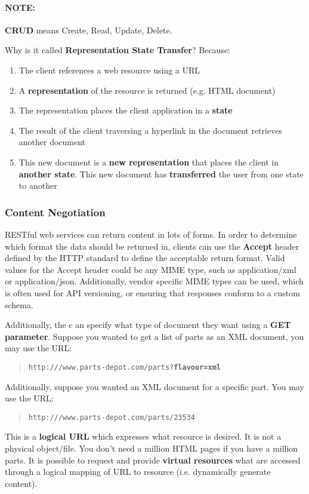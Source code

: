 \documentclass{article}
\begin{document}
\paragraph{\textbf{NOTE: }} \textbf{CRUD} means Create, Read, Update, Delete.

Why is it called \textbf{Representation State Transfer}? Because:
\begin{enumerate}
	\item The client references a web resource using a URL
	\item A \textbf{representation} of the resource is returned (e.g. HTML document)
	\item The representation places the client application in a \textbf{state}
	\item The result of the client traversing a hyperlink in the document retrieves another document
	\item This new document is a \textbf{new representation} that places the client in \textbf{another state}. This new document has \textbf{transferred} the user from one state to another
\end{enumerate}

\subsubsection{Content Negotiation}

RESTful web services can return content in lots of forms. In order to determine which format the data should be returned in, clients can use the \textbf{Accept} header defined by the HTTP standard to define the acceptable return format. Valid values for the Accept header could be any MIME type, such as application/xml or application/json. Additionally, vendor specific MIME types can be used, which is often used for API versioning, or ensuring that responses conform to a custom schema.

Additionally, the c an specify what type of document they want using a \textbf{GET parameter}. Suppose you wanted to get a list of parts as an XML document, you may use the URL:
\begin{quote}
	\texttt{http:///www.parts-depot.com/parts?\textbf{flavour=xml}}
\end{quote}

Additionally, suppose you wanted an XML document for a specific part. You may use the URL:
\begin{quote}
	\texttt{http:///www.parts-depot.com/parts/23534}
\end{quote}
This is a \textbf{logical URL} which expresses what resource is desired. It is not a physical object/file. You don't need a million HTML pages if you have a million parts. It is possible to request and provide \textbf{virtual resources} what are accessed through a logical mapping of URL to resource (i.e. dynamically generate content).
\end{document}
